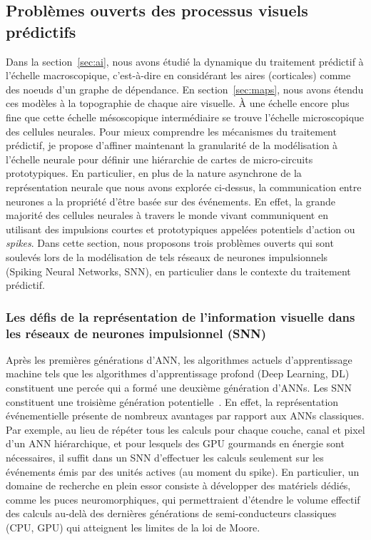 \subsection{Problèmes ouverts des processus visuels prédictifs}
\label{sec:spikes}
Dans la section~\ref{sec:ai}, nous avons étudié la dynamique du traitement prédictif à
l'échelle macroscopique, c'est-à-dire en considérant les aires
(corticales) comme des noeuds d'un graphe de dépendance. En section~\ref{sec:maps},
nous avons étendu ces modèles à la topographie de chaque aire visuelle. À une échelle
encore plus fine que cette échelle mésoscopique intermédiaire se trouve
l'échelle microscopique des cellules neurales. Pour mieux
comprendre les mécanismes du traitement prédictif, je propose d'affiner
maintenant la granularité de la modélisation à l'échelle neurale
pour définir une hiérarchie de cartes de micro-circuits prototypiques. En
particulier, en plus de la nature asynchrone de la représentation
neurale que nous avons explorée ci-dessus, la communication entre
neurones a la propriété d'être basée sur des événements. En effet, la
grande majorité des cellules neurales à travers le monde vivant
communiquent en utilisant des impulsions courtes et prototypiques
appelées potentiels d'action ou \emph{spikes}. Dans cette section, nous
proposons trois problèmes ouverts qui sont soulevés lors de la
modélisation de tels réseaux de neurones impulsionnels (Spiking Neural Networks, SNN), en particulier dans le contexte du traitement prédictif.

\subsubsection{Les défis de la représentation de l'information visuelle
dans les réseaux de neurones impulsionnel
(SNN)}
Après les premières générations d'ANN, les algorithmes actuels
d'apprentissage machine tels que les algorithmes d'apprentissage profond
(Deep Learning, DL) constituent une percée qui a formé une deuxième génération d'ANNs.
Les SNN constituent une troisième génération potentielle~\citep{Ghosh09}. En effet, la représentation événementielle présente de
nombreux avantages par rapport aux ANNs classiques. Par exemple, au lieu de
répéter tous les calculs ­pour chaque couche, canal et pixel d'un ANN
hiérarchique, et pour lesquels des GPU gourmands en énergie sont
nécessaires, il suffit dans un SNN d'effectuer les calculs seulement sur les événements
émis par des unités actives (au moment du spike). En particulier, un domaine de
recherche en plein essor consiste à développer des matériels dédiés,
comme les puces neuromorphiques, qui permettraient d'étendre le volume
effectif des calculs au-delà des dernières générations de
semi-conducteurs classiques (CPU, GPU) qui atteignent les limites de la
loi de Moore.


